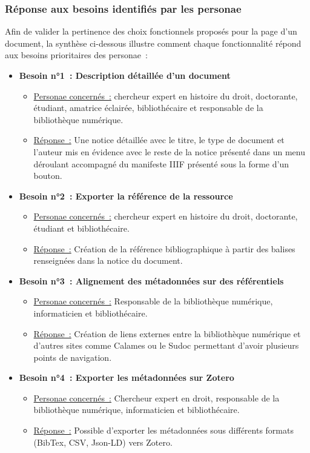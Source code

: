 \subsubsection{Réponse aux besoins identifiés par les personae}
Afin de valider la pertinence des choix fonctionnels proposés pour la page d’un document, la synthèse ci-dessous illustre comment chaque fonctionnalité répond aux besoins prioritaires des personae :
\begin{itemize}
	\item \textbf{Besoin n°1 : Description détaillée d’un document}
\begin{itemize}
	\item \uline{Personae concernés :} chercheur expert en histoire du droit, doctorante, étudiant, amatrice éclairée, bibliothécaire et responsable de la bibliothèque numérique.
\item \uline{Réponse :} Une notice détaillée avec le titre, le type de document et l’auteur mis en évidence avec le reste de la notice présenté dans un menu déroulant accompagné du manifeste IIIF présenté sous la forme d’un bouton.
\end{itemize} 
\item \textbf{Besoin n°2 : Exporter la référence de la ressource}
\begin{itemize}
	\item \uline{Personae concernés :} chercheur expert en histoire du droit, doctorante, étudiant et bibliothécaire.
\item \uline{Réponse :} Création de la référence bibliographique à partir des balises renseignées dans la notice du document.
\end{itemize}
\item \textbf{Besoin n°3 : Alignement des métadonnées sur des référentiels}  
\begin{itemize}
	\item \uline{Personae concernés :} Responsable de la bibliothèque numérique, informaticien et bibliothécaire.
\item \uline{Réponse :} Création de liens externes entre la bibliothèque numérique et d’autres sites comme Calames ou le Sudoc permettant d’avoir plusieurs points de navigation.
\end{itemize}
\item \textbf{Besoin n°4 : Exporter les métadonnées sur Zotero} 
\begin{itemize}
	\item \uline{Personae concernés :} Chercheur expert en droit, responsable de la bibliothèque numérique, informaticien et bibliothécaire.
\item \uline{Réponse :} Possible d’exporter les métadonnées sous différents formats (BibTex, CSV, Json-LD) vers Zotero.
\end{itemize}
\end{itemize}

